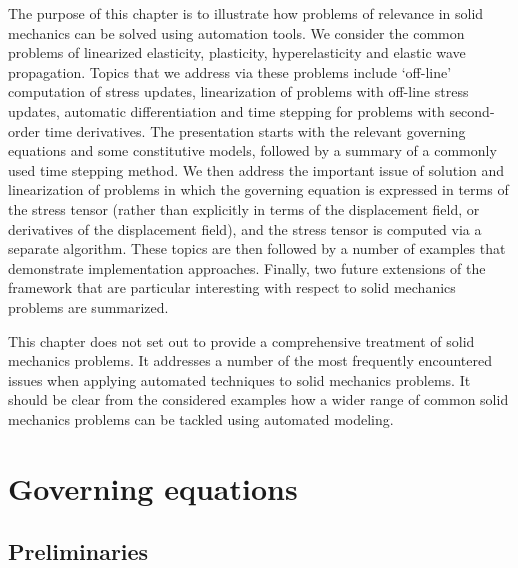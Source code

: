 The purpose of this chapter is to illustrate how problems of relevance
in solid mechanics can be solved using automation tools.  We consider
the common problems of linearized elasticity, plasticity, hyperelasticity
and elastic wave propagation.  Topics that we address via these problems
include `off-line' computation of stress updates, linearization of
problems with off-line stress updates, automatic differentiation and time
stepping for problems with second-order time derivatives. The presentation
starts with the relevant governing equations and some constitutive models,
followed by a summary of a commonly used time stepping method.  We then
address the important issue of solution and linearization of problems
in which the governing equation is expressed in terms of the stress
tensor (rather than explicitly in terms of the displacement field, or
derivatives of the displacement field), and the stress tensor is computed
via a separate algorithm.  These topics are then followed by a number
of examples that demonstrate implementation approaches.  Finally,
two future extensions of the \fenics framework that are particular
interesting with respect to solid mechanics problems are summarized.

This chapter does not set out to provide a comprehensive treatment of
solid mechanics problems. It addresses a number of the most frequently
encountered issues when applying automated techniques to solid mechanics
problems. It should be clear from the considered examples how a wider
range of common solid mechanics problems can be tackled using automated
modeling.

\section{Governing equations}
\subsection{Preliminaries}

